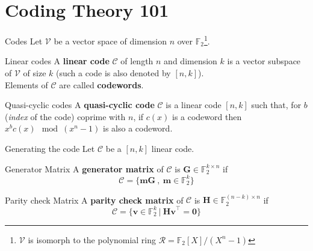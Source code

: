 \section{Coding Theory 101}
\begin{frame}
    \sectionpage
\end{frame}

\begin{frame}{Codes}
    Let $\mathcal{V}$ be a vector space of dimension $n$ over $\mathds{F}_2$\footnote{$\mathcal{V}$ is isomorph to the polynomial ring $\mathcal{R} = \mathds{F}_2[X]/(X^n-1)$}.
    \begin{block}{Linear codes}
        A \textbf{linear code} $\mathcal{C}$ of length $n$ and dimension $k$ is a
        vector subspace of $\mathcal{V}$ of size $k$ (such a code is also denoted by $[n, k]$).\\
        Elements of $\mathcal{C}$ are called \textbf{codewords}.
    \end{block}
    \begin{block}{Quasi-cyclic codes}
        A \textbf{quasi-cyclic code} $\mathcal{C}$ is a linear code $[n, k]$ such that, for $b$ (\textit{index} of the code) coprime with $n$, if $c(x)$ is a codeword 
        then $x^bc(x) \mod (x^n-1)$ is also a codeword.
    \end{block}
\end{frame}

\begin{frame}{Generating the code}
    Let $\mathcal{C}$ be a $[n, k]$ linear code.
    \begin{block}{Generator Matrix}
         A \textbf{generator matrix} of $\mathcal{C}$ is ${\mathbf{G} \in \mathds{F}_{2}^{k\times n}}$ if
        \begin{equation*}
            \mathcal{C} = \lbrace \mathbf{mG} ~,~ \mathbf{m} \in \mathds{F}_{2}^{k} \rbrace
        \end{equation*}       
    \end{block}
    \begin{block}{Parity check Matrix}
        A \textbf{parity check matrix} of $\mathcal{C}$ is ${\mathbf{H} \in \mathds{F}_{2}^{(n-k)\times n}}$ if
       \begin{equation*}
           \mathcal{C} = \lbrace \mathbf{v} \in \mathds{F}_2^k ~|~ \mathbf{Hv}^\top = \mathbf{0} \rbrace
       \end{equation*}       
   \end{block}
\end{frame}

